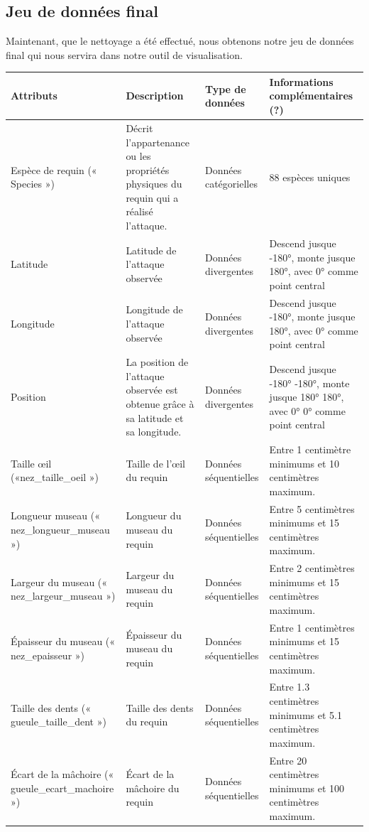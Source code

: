 \documentclass{article}
\begin{document}
\subsection{Jeu de données final}
Maintenant, que le nettoyage a été effectué, nous obtenons notre jeu de données final qui nous servira dans notre outil de visualisation.

\begin{longtable}[h]{|p{} | p{}|p{}|p{}|}
\hline
Attributs & Description & Type de données & Informations complémentaires (?) \\ \hline
 Espèce de requin (« Species ») & Décrit l’appartenance ou les propriétés physiques du requin qui a réalisé l’attaque. & Données catégorielles & 88 espèces uniques \\ \hline
 Latitude  & Latitude de l’attaque observée & Données divergentes  & Descend jusque -\ang{180}, monte jusque \ang{180}, avec \ang{0} comme point central  \\ \hline
 Longitude & Longitude de l’attaque observée & Données divergentes  & Descend jusque -\ang{180}, monte jusque \ang{180}, avec \ang{0} comme point central \\ \hline
 Position & La position de l’attaque observée est obtenue grâce à sa latitude et sa longitude. & Données divergentes  & 
 Descend jusque -\ang{180} -\ang{180}, monte jusque \ang{180} \ang{180}, avec \ang{0} \ang{0} comme point central \\ \hline
 Taille œil («nez\_taille\_oeil »)  & Taille de l’œil du requin & Données séquentielles & Entre 1 centimètre minimums et 10 centimètres maximum. \\ \hline
 Longueur museau (« nez\_longueur\_museau ») & Longueur du museau du requin & Données séquentielles & Entre 5 centimètres minimums et 15 centimètres maximum. \\ \hline
 Largeur du museau (« nez\_largeur\_museau ») & Largeur du museau du requin & Données séquentielles & Entre 2 centimètres minimums et 15 centimètres maximum. \\ \hline
 Épaisseur du museau (« nez\_epaisseur ») & Épaisseur du museau du requin & Données séquentielles & Entre 1 centimètres minimums et 15 centimètres maximum. \\ \hline
 Taille des dents (« gueule\_taille\_dent ») & Taille des dents du requin & Données séquentielles  & Entre 1.3 centimètres minimums et 5.1 centimètres maximum. \\ \hline
 Écart de la mâchoire (« gueule\_ecart\_machoire »)  & Écart de la mâchoire du requin & Données séquentielles & Entre 20 centimètres minimums et 100 centimètres maximum. \\ \hline

\end{longtable}
\end{document}

